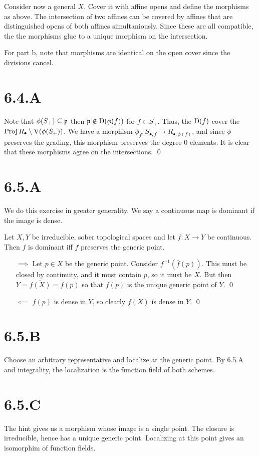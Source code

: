 \documentclass{article}
\begin{document}
Consider now a general $X$. Cover it with affine opens and define the morphisms as above. The intersection of two affines can be covered by affines that are distinguished opens of both affines simultaniously. Since these are all compatible, the the morphisms glue to a unique morphism on the intersection.

For part b, note that morphisms are identical on the open cover since the divisions cancel.

\section{6.4.A}
Note that $\phi(S_+) \subseteq \mathfrak{p}$ then $\mathfrak{p} \notin \operatorname{D}(\phi(f))$ for $f \in S_+$. Thus, the $\operatorname{D}(f)$ cover the $\operatorname{Proj} R_{\bullet} \setminus \operatorname{V}(\phi(S_+))$. We have a morphism $\phi_f : S_{\bullet, f} \to R_{\bullet, \phi(f)}$, and since $\phi$ preserves the grading, this morphism preserves the degree 0 elements. It is clear that these morphisms agree on the intersections. \qed

\section{6.5.A}
We do this exercise in greater generality. We say a continuous map is dominant if the image is dense.

Let $X, Y$ be irreducible, sober topological spaces and let $f: X \to Y$ be continuous. Then $f$ is dominant iff $f$ preserves the generic point.

\begin{itemize}
    \item[$\implies$] Let $p\in X$ be the generic point. Consider $f^{-1}(\overline{f}(p))$. This must be closed by continuity, and it must contain $p$, so it must be $X$. But then $Y = \overline{f(X)} = \overline{f}(p)$ so that $f(p)$ is the unique generic point of $Y$. \qed
    \item[$\impliedby$] $f(p)$ is dense in $Y$, so clearly $f(X)$ is dense in $Y$. \qed
\end{itemize}

\section{6.5.B}
Choose an arbitrary representative and localize at the generic point. By 6.5.A and integrality, the localization is the function field of both schemes.

\section{6.5.C}
The hint gives us a morphism whose image is a single point. The closure is irreducible, hence has a unique generic point. Localizing at this point gives an isomorphim of function fields.
\end{document}
